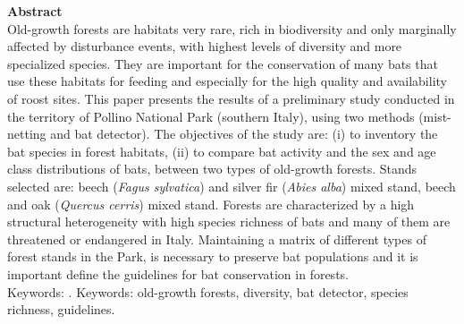{\textbf{Abstract}\\
 Old-growth forests are habitats very rare, rich in biodiversity and only marginally affected by disturbance events, with highest levels of diversity and more specialized species. They are important for the conservation of many bats that use these habitats for feeding and especially for the high quality and availability of roost sites. This paper presents the results of a preliminary study conducted in the territory of Pollino National Park (southern Italy), using two methods (mist-netting and bat detector). The objectives of the study are: (i) to inventory the bat species in forest habitats, (ii) to compare bat activity and the sex and age class distributions of bats, between two types of old-growth forests. Stands selected are: beech (\emph{Fagus sylvatica}) and silver fir (\emph{Abies alba}) mixed stand, beech and oak (\emph{Quercus cerris}) mixed stand. Forests are characterized by a high structural heterogeneity with high species richness of bats and  many of them are threatened or endangered in Italy. Maintaining a matrix of different types of forest stands in the Park, is necessary to preserve bat populations and it is important define the guidelines for  bat conservation in forests.\\

Keywords: .
{\footnotesize Keywords: old-growth forests, diversity, bat detector, species richness, guidelines.} 
} %